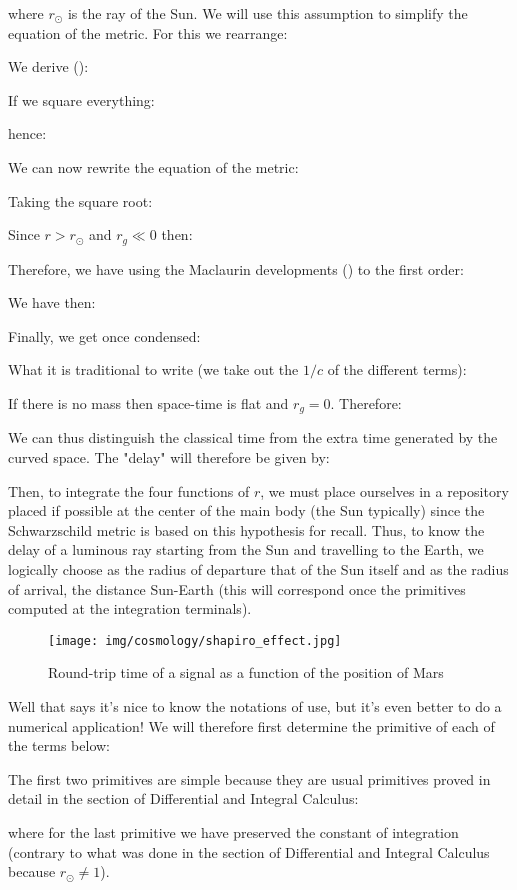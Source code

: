 	where $r_\odot$ is the ray of the Sun. We will use this assumption to simplify the equation of the metric. For this we rearrange:
	
	We derive ():
	
	If we square everything:
	
	hence:
	
	We can now rewrite the equation of the metric:
	
	Taking the square root:
	
	Since $r>r_\odot$ and $r_g\ll 0$ then:
	
	Therefore, we have using the Maclaurin developments () to the first order:
	
	We have then:
	
	Finally, we get once condensed:
	
	What it is traditional to write (we take out the $1 / c$ of the different terms):
	
	If there is no mass then space-time is flat and $r_g=0$. Therefore:
	
	We can thus distinguish the classical time from the extra time generated by the curved space. The "delay" will therefore be given by:
	
	Then, to integrate the four functions of $r$, we must place ourselves in a repository placed if possible at the center of the main body (the Sun typically) since the Schwarzschild metric is based on this hypothesis for recall. Thus, to know the delay of a luminous ray starting from the Sun and travelling to the Earth, we logically choose as the radius of departure that of the Sun itself and as the radius of arrival, the distance Sun-Earth (this will correspond once the primitives computed at the integration terminals).
	\begin{figure}[H]
		\centering
		\texttt{[image: img/cosmology/shapiro\_effect.jpg]}	
		\caption{Round-trip time of a signal as a function of the position of Mars}
	\end{figure}
	Well that says it's nice to know the notations of use, but it's even better to do a numerical application! We will therefore first determine the primitive of each of the terms below:
	
	The first two primitives are simple because they are usual primitives proved in detail in the section of Differential and Integral Calculus:
	
	where for the last primitive we have preserved the constant of integration (contrary to what was done in the section of Differential and Integral Calculus because $r_\odot\neq 1$).

